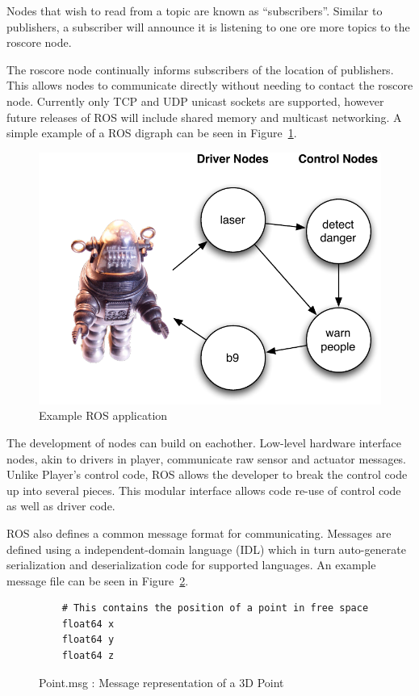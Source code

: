 Nodes that wish to read from a topic are known as ``subscribers''. Similar to publishers, a subscriber will announce it is listening to one ore more topics to the roscore node.

The roscore node continually informs subscribers of the location of publishers. This allows nodes to communicate directly without needing to contact the roscore node. Currently only TCP and UDP unicast sockets are supported, however future releases of ROS will include shared memory and multicast networking. A simple example of a ROS digraph can be seen in Figure~\ref{fig:middleware-ros}.

\begin{figure}[ht]
\includegraphics{images/middleware-ros.pdf}
\caption{Example ROS application\label{fig:middleware-ros}}
\end{figure}

The development of nodes can build on eachother. Low-level hardware interface nodes, akin to drivers in player, communicate raw sensor and actuator messages. Unlike Player's control code, ROS allows the developer to break the control code up into several pieces. This modular interface allows code re-use of control code as well as driver code.

ROS also defines a common message format for communicating. Messages are defined using a independent-domain language (IDL) which in turn auto-generate serialization and deserialization code for supported languages. An example message file can be seen in Figure~\ref{fig:point}.

\begin{figure}[ht]
\makebox[\textwidth]{\hrulefill}
\begin{verbatim}
	# This contains the position of a point in free space
	float64 x
	float64 y
	float64 z
\end{verbatim}
\makebox[\textwidth]{\hrulefill}
\caption{Point.msg : Message representation of a 3D Point\label{fig:point}}
\end{figure}

